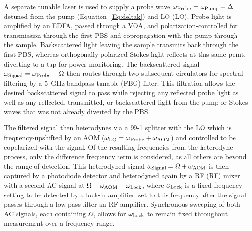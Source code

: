 A separate tunable laser is used to supply a probe wave \(\omega_{\rm Probe} = \omega_{\rm Pump} - \Delta\) detuned from the pump (Equation~\ref{Eq:deltak}) and \acl{LO} (\ac{LO}). Probe light is amplified by an \ac{EDFA}, passed through a \ac{VOA}, and polarization-controlled for transmission through the first \ac{PBS} and copropagation with the pump through the sample. Backscattered light leaving the sample transmits back through the first \ac{PBS}, whereas orthogonally polarized Stokes light reflects at this same point, diverting to a tap for power monitoring. The backscattered signal \(\omega_{\rm Signal} = \omega_{\rm Probe} - \Omega\) then routes through two subsequent circulators for spectral filtering by a \SI{5}{\giga\hertz} bandpass tunable (\ac{FBG}) filter. This filtration allows the desired backscattered signal to pass while rejecting any reflected probe light as well as any reflected, transmitted, or backscattered light from the pump or Stokes waves that was not already diverted by the \ac{PBS}.

The filtered signal then heterodynes via a 99-1 splitter with the \ac{LO} which is frequency-upshifted by an \acl{AOM} (\(\omega_{\rm LO} = \omega_{\rm Probe} + \omega_{\rm AOM}\)) and controlled to be copolarized with the signal. Of the resulting frequencies from the heterodyne process, only the difference frequency term is considered, as all others are beyond the range of detection. This heterodyned signal \(\omega_{\rm Signal} = \Omega + \omega_{\rm AOM}\) is then captured by a photodiode detector and heterodyned again by a \acl{RF} (\ac{RF}) mixer with a second \ac{AC} signal at \(\Omega + \omega_{\rm AOM} - \omega_{\rm Lock}\), where \(\omega_{\rm Lock}\) is a fixed-frequency setting to be detected by a lock-in amplifier. set to this frequency after the signal passes through a low-pass filter an \ac{RF} amplifier. Synchronous sweeping of both \ac{AC} signals, each containing \(\Omega\), allows for \(\omega_{\rm Lock}\) to remain fixed throughout measurement over a frequency range.

